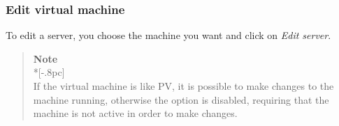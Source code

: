 \subsubsection{Edit virtual machine}
\label{sec:edit_server}
To edit a server, you choose the machine you want and click on \emph{Edit server}.

    \begin{quote}
        {\large \bf Note} \\*[-.8pc]
        \underline{\hspace{6in}} \\
        If the virtual machine is like PV, it is possible to make changes to the machine running, otherwise the option is disabled, requiring that the machine is not active in order to make changes.
    \end{quote}

